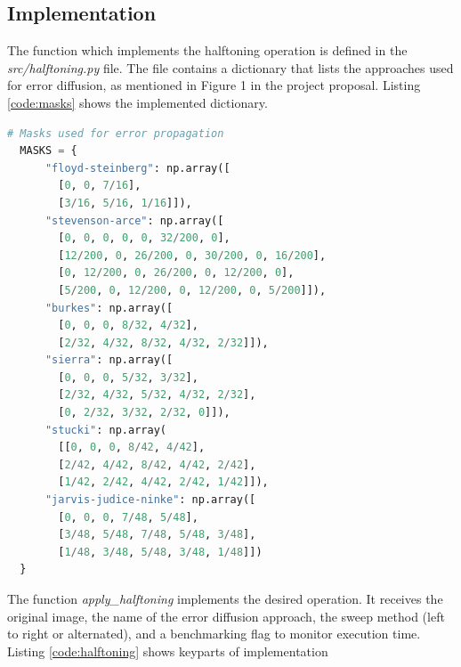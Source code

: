 \documentclass[]{IEEEtran}
\begin{document}
\subsection{Implementation}
The function which implements the halftoning operation is defined in the \textit{src/halftoning.py} file. The file contains a dictionary that lists the approaches used for error diffusion, as mentioned in Figure 1 in the project proposal. Listing \ref{code:masks} shows the implemented dictionary.

\begin{lstlisting}[language=Python, caption={Masks used for error diffusion}, label={code:masks}]
  # Masks used for error propagation
  MASKS = {
      "floyd-steinberg": np.array([
        [0, 0, 7/16],
        [3/16, 5/16, 1/16]]),
      "stevenson-arce": np.array([
        [0, 0, 0, 0, 0, 32/200, 0],
        [12/200, 0, 26/200, 0, 30/200, 0, 16/200],
        [0, 12/200, 0, 26/200, 0, 12/200, 0],
        [5/200, 0, 12/200, 0, 12/200, 0, 5/200]]),
      "burkes": np.array([
        [0, 0, 0, 8/32, 4/32],
        [2/32, 4/32, 8/32, 4/32, 2/32]]),
      "sierra": np.array([
        [0, 0, 0, 5/32, 3/32],
        [2/32, 4/32, 5/32, 4/32, 2/32],
        [0, 2/32, 3/32, 2/32, 0]]),
      "stucki": np.array(
        [[0, 0, 0, 8/42, 4/42],
        [2/42, 4/42, 8/42, 4/42, 2/42],
        [1/42, 2/42, 4/42, 2/42, 1/42]]),
      "jarvis-judice-ninke": np.array([
        [0, 0, 0, 7/48, 5/48],
        [3/48, 5/48, 7/48, 5/48, 3/48],
        [1/48, 3/48, 5/48, 3/48, 1/48]])
  }
\end{lstlisting}
The function \textit{apply\_halftoning} implements the desired operation. It receives the original image, the name of the error diffusion approach, the sweep method (left to right or alternated), and a benchmarking flag to monitor execution time. Listing \ref{code:halftoning} shows keyparts of implementation
\end{document}
